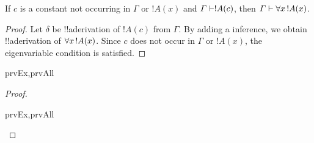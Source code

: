 \documentclass[../../../include/open-logic-section]{subfiles}
\begin{document}


\begin{thm}
 If $c$ is a constant not occurring
in $\Gamma$ or $!A(x)$ and $\Gamma \Proves !A(c)$, then $\Gamma
\Proves \lforall[x][!A(x)]$.
\end{thm}

\begin{proof}
Let $\delta$ be !!a{derivation} of $!A(c)$ from $\Gamma$.  By adding a
\Intro{\lforall} inference, we obtain !!a{derivation} of
$\lforall[x][!A(x)]$. Since $c$ does not occur in $\Gamma$ or $!A(x)$,
the eigenvariable condition is satisfied.
\end{proof}

\begin{prop}
\begin{tagenumerate}{prvEx,prvAll}

\end{tagenumerate}
\end{prop}

\begin{proof}
\begin{tagenumerate}{prvEx,prvAll}

\end{tagenumerate}
\end{proof}
\end{document}
